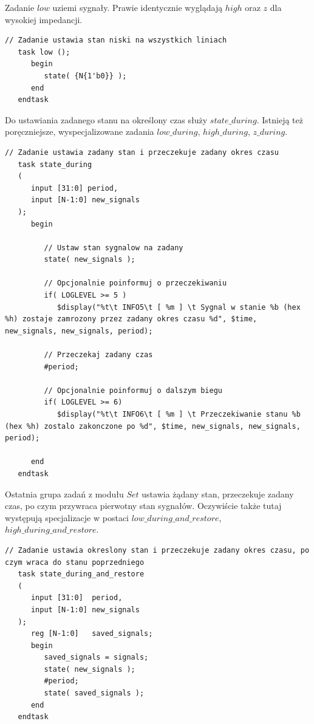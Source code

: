 \documentclass[a4paper,12pt]{article}
\begin{document}
Zadanie $low$ uziemi sygnały. Prawie identycznie wyglądają $high$ oraz $z$ dla wysokiej impedancji.
\begin{lstlisting}[label=Set,caption=Set.v,firstnumber=47]
   // Zadanie ustawia stan niski na wszystkich liniach
   task low ();
      begin
         state( {N{1'b0}} );
      end
   endtask
\end{lstlisting}

Do ustawiania zadanego stanu na określony czas służy $state\_during$. Istnieją też poręczniejsze, wyspecjalizowane zadania $low\_during$, $high\_during$, $z\_during$.
\begin{lstlisting}[label=Set,caption=Set.v,firstnumber=71]
   // Zadanie ustawia zadany stan i przeczekuje zadany okres czasu
   task state_during
   (
      input [31:0] period,
      input [N-1:0] new_signals
   );
      begin

         // Ustaw stan sygnalow na zadany
         state( new_signals );

         // Opcjonalnie poinformuj o przeczekiwaniu
         if( LOGLEVEL >= 5 )
            $display("%t\t INFO5\t [ %m ] \t Sygnal w stanie %b (hex %h) zostaje zamrozony przez zadany okres czasu %d", $time, new_signals, new_signals, period);

         // Przeczekaj zadany czas
         #period;

         // Opcjonalnie poinformuj o dalszym biegu
         if( LOGLEVEL >= 6)
            $display("%t\t INFO6\t [ %m ] \t Przeczekiwanie stanu %b (hex %h) zostalo zakonczone po %d", $time, new_signals, new_signals, period);

      end
   endtask
\end{lstlisting}

Ostatnia grupa zadań z modułu $Set$ ustawia żądany stan, przeczekuje zadany czas, po czym przywraca pierwotny stan sygnałów. Oczywiście także tutaj występują specjalizacje w postaci $low\_during\_and\_restore$, $high\_during\_and\_restore$.
\begin{lstlisting}[label=Set,caption=Set.v,firstnumber=71]
   // Zadanie ustawia okreslony stan i przeczekuje zadany okres czasu, po czym wraca do stanu poprzedniego
   task state_during_and_restore
   (
      input [31:0]  period,
      input [N-1:0] new_signals
   );
      reg [N-1:0]   saved_signals;
      begin
         saved_signals = signals;
         state( new_signals );
         #period;
         state( saved_signals );
      end
   endtask
\end{lstlisting}
\end{document}

